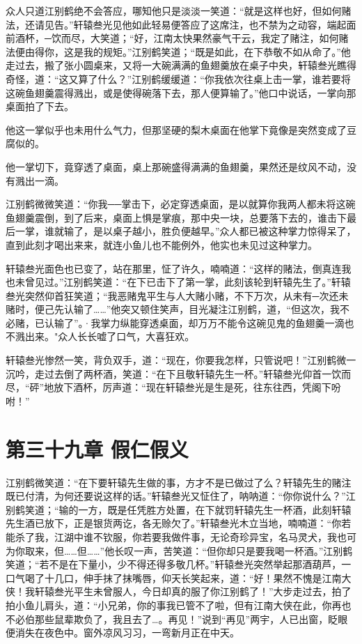 \documentclass[12pt,oneside]{book}
\begin{document}
众人只道江别鹤绝不会答应，哪知他只是淡淡一笑道：``就是这样也好，但如何赌法，还请见告。''轩辕叁光见他如此轻易便答应了这席注，也不禁为之动容，端起面前酒杯，─饮而尽，大笑道；``好，江南太快果然豪气干云，我定了赌注，如何赌法便由得你，这是我的规矩。''江别鹤笑道；``既是如此，在下恭敬不如从命了。''他走过去，搬了张小圆桌来，又将一大碗满满的鱼翅羹放在桌子中央，轩辕叁光瞧得奇怪，道：``这又算了什么？''江别鹤缓缓道：``你我依次往桌上击一掌，谁若要将这碗鱼翅羹震得溅出，或是使得碗落下去，那人便算输了。''他口中说话，一掌向那桌面拍了下去。

他这一掌似乎也未用什么气力，但那坚硬的梨木桌面在他掌下竟像是突然变成了豆腐似的。

他一掌切下，竟穿透了桌面，桌上那碗盛得满满的鱼翅羹，果然还是纹风不动，没有溅出一滴。

江别鹤微微笑道：``你我──掌击下，必定穿透桌面，是以就算你我两人都未将这碗鱼翅羹震倒，到了后来，桌面上惧是掌痕，那中央一块，总要落下去的，谁击下最后一掌，谁就输了，是以桌子越小，胜负便越早。''众人都已被这种掌力惊得呆了，直到此刻才喝出来来，就连小鱼儿也不能例外，他实也未见过这种掌力。

轩辕叁光面色也已变了，站在那里，怔了许久，喃喃道：``这样的赌法，倒真连我也未曾见过。''江别鹤笑道：``在下已击下了第一掌，此刻该轮到轩辕先生了。''轩辕叁光突然仰首狂笑道；``我恶赌鬼平生与人大赌小赌，不下万次，从未有─次还未赌时，便己先认输了\ldots\ldots{}''他突又顿住笑声，目光凝注江别鹤，道，``但这次，我不必赌，已认输了''。·我掌力纵能穿透桌面，却万万不能令这碗见鬼的鱼翅羹一滴也不溅出来。"众人长长嘘了口气，大喜狂欢。

轩辕叁光惨然一笑，背负双手，道：``现在，你要我怎样，只管说吧！''江别鹤微一沉吟，走过去倒了两杯酒，笑道：``在下且敬轩辕先生一杯。''轩辕叁光仰首一饮而尽，``砰''地放下酒杯，厉声道：``现在轩辕叁光是生是死，往东往西，凭阁下吩咐！''

\hypertarget{ux7b2cux4e09ux5341ux4e5dux7ae0-ux5047ux4ec1ux5047ux4e49}{%
\chapter{第三十九章
假仁假义}\label{ux7b2cux4e09ux5341ux4e5dux7ae0-ux5047ux4ec1ux5047ux4e49}}

江别鹤微笑道：``在下要轩辕先生做的事，方才不是已做过了么？轩辕先生的赌注既已付清，为何还要说这样的话。''轩辕叁光又怔住了，呐呐道：``你你说什么？''江别鹤笑道；``输的一方，既是任凭胜方处置，在下就罚轩辕先生一杯酒，此刻轩辕先生酒已放下，正是银货两讫，各无赊欠了。''轩辕叁光木立当地，喃喃道：``你若能杀了我，江湖中谁不钦服，你若要我做件事，无论奇珍异宝，名马灵犬，我也可为你取来，但\ldots\ldots 但\ldots\ldots{}''他长叹一声，苦笑道：``但你却只是要我喝一杯酒。''江别鹤笑道；``若不是在下量小，少不得还得多敬几杯。''轩辕叁光突然举起那酒葫芦，一口气喝了十几口，伸手抹了抹嘴唇，仰天长笑起来，道：``好！果然不愧是江南大侠！我轩辕叁光平生未曾服人，今日却真的服了你江别鹤了！''大步走过去，拍了拍小鱼儿肩头，道：``小兄弟，你的事我已管不了啦，但有江南大侠在此，你再也不必伯那些鼠辈欺负了，我且去了\ldots。再见！''说到``再见''两宇，人已出窗，眨眼便消失在夜色中。窗外凉风习习，一弯新月正在中天。
\end{document}
